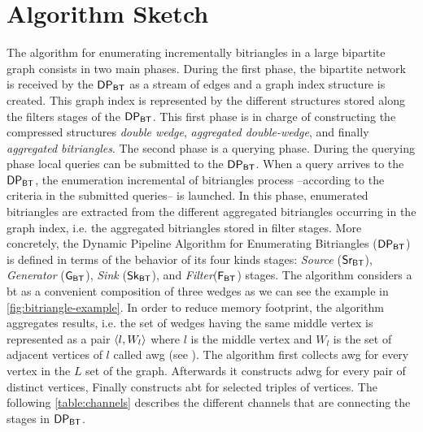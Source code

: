 \section{Algorithm Sketch}\label{sub:sec:algo-sketch}
The algorithm for enumerating incrementally bitriangles in a large bipartite graph consists in two main phases. 
During the first phase, the bipartite network is received by the $\mathsf{DP_{BT}}$ as a stream of edges and a graph index structure is created. 
This graph index is represented by the different structures stored along the filters stages of the $\mathsf{DP_{BT}}$. 
This first phase is in charge of constructing the compressed structures \emph{double wedge}, \emph{aggregated double-wedge}, and finally \emph{aggregated bitriangles}.
The second phase is a querying phase. During the querying phase local queries can be submitted to the $\mathsf{DP_{BT}}$. 
When a query arrives to the $\mathsf{DP_{BT}}$, the enumeration incremental of bitriangles process --according to the criteria in the submitted  queries-- is launched. 
In this phase, enumerated bitriangles are extracted from the different aggregated bitriangles occurring in the graph index, i.e. the aggregated bitriangles stored in filter stages.
More concretely, the Dynamic Pipeline Algorithm for Enumerating Bitriangles ($\mathsf{DP_{BT}}$) is defined in terms of the behavior of its four kinds stages: \textit{Source} ($\mathsf{Sr_{BT}}$),  
\textit{Generator} ($\mathsf{G_{BT}}$),  \textit{Sink} ($\mathsf{Sk_{BT}}$), and \textit{Filter}($\mathsf{F_{BT}}$) stages. 
The algorithm considers a \acrlong{bt} as a convenient composition of three wedges as we can see the example in \autoref{fig:bitriangle-example}.
In order to reduce memory footprint, the algorithm aggregates results, i.e. the set of wedges having the same middle vertex is represented as a pair $\left\langle l, W_l \right\rangle$ where $l$ is the middle vertex and $W_l$ is the set of adjacent vertices of $l$ called \acrfull{awg} (see ).
The algorithm first collects \acrshort{awg} for every vertex in the $L$ set of the graph. Afterwards it constructs \acrfull{adwg} for every pair of distinct vertices, Finally  constructs \acrshort{abt}  for selected triples of vertices. 
The following \autoref{table:channels} describes the different channels that are connecting the stages in $\mathsf{DP_{BT}}$.

